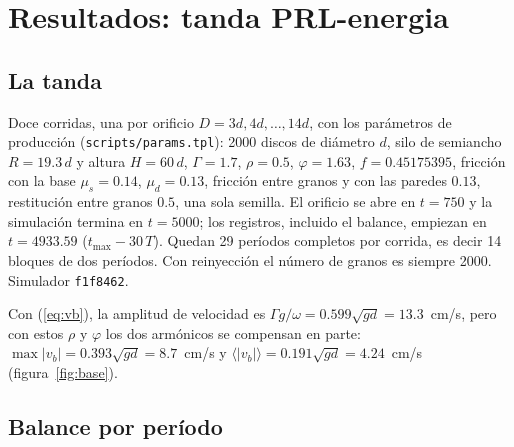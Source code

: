 \documentclass[11pt,a4paper]{article}
\newcommand{\code}[1]{\texttt{#1}}
\newcommand{\ave}[1]{\langle #1 \rangle}
\begin{document}
\section{Resultados: tanda PRL-energia}
\label{sec:resultados}

\subsection{La tanda}

Doce corridas, una por orificio $D = 3d, 4d, \dots, 14d$, con los
parámetros de producción (\code{scripts/params.tpl}): 2000 discos de
diámetro $d$, silo de semiancho $R = 19.3\,d$ y altura $H = 60\,d$,
$\Gamma = 1.7$, $\rho = 0.5$, $\varphi = 1.63$, $f = 0.45175395$,
fricción con la base $\mu_s = 0.14$, $\mu_d = 0.13$, fricción entre
granos y con las paredes $0.13$, restitución entre granos $0.5$, una sola
semilla. El orificio se abre en $t = 750$ y la simulación termina en
$t = 5000$; los registros, incluido el balance, empiezan en
$t = 4933.59$ ($t_\text{max} - 30\,T$). Quedan 29 períodos completos por
corrida, es decir 14 bloques de dos períodos. Con reinyección el número de
granos es siempre 2000. Simulador \code{f1f8462}.

Con (\ref{eq:vb}), la amplitud de velocidad es
$\Gamma g/\omega = 0.599\sqrt{gd} = 13.3$~cm/s, pero con estos $\rho$ y
$\varphi$ los dos armónicos se compensan en parte: $\max|v_b| =
0.393\sqrt{gd} = 8.7$~cm/s y $\ave{|v_b|} = 0.191\sqrt{gd} =
4.24$~cm/s (figura~\ref{fig:base}).

\subsection{Balance por período}
\end{document}
